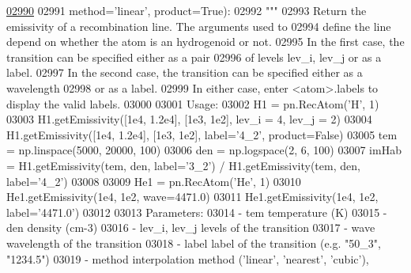 \begin{DoxyCode}
\hypertarget{classpyneb_1_1core_1_1pynebcore_1_1_rec_atom_l02990}{}\hyperlink{classpyneb_1_1core_1_1pynebcore_1_1_rec_atom_ac03957666aff1955387fcc03c6187ad3}{02990} 
02991                       method=\textcolor{stringliteral}{'linear'}, product=\textcolor{keyword}{True}):
02992         \textcolor{stringliteral}{"""}
02993 \textcolor{stringliteral}{        Return the emissivity of a recombination line. The arguments used to }
02994 \textcolor{stringliteral}{        define the line depend on whether the atom is an hydrogenoid or not. }
02995 \textcolor{stringliteral}{        In the first case, the transition can be specified either as a pair }
02996 \textcolor{stringliteral}{        of levels lev\_i, lev\_j or as a label. }
02997 \textcolor{stringliteral}{        In the second case, the transition can be specified either as a wavelength }
02998 \textcolor{stringliteral}{        or as a label.}
02999 \textcolor{stringliteral}{        In either case, enter <atom>.labels to display the valid labels.}
03000 \textcolor{stringliteral}{        }
03001 \textcolor{stringliteral}{        Usage:}
03002 \textcolor{stringliteral}{            H1 = pn.RecAtom('H', 1)}
03003 \textcolor{stringliteral}{            H1.getEmissivity([1e4, 1.2e4], [1e3, 1e2], lev\_i = 4, lev\_j = 2)}
03004 \textcolor{stringliteral}{            H1.getEmissivity([1e4, 1.2e4], [1e3, 1e2], label='4\_2', product=False)}
03005 \textcolor{stringliteral}{            tem = np.linspace(5000, 20000, 100)}
03006 \textcolor{stringliteral}{            den = np.logspace(2, 6, 100)}
03007 \textcolor{stringliteral}{            imHab = H1.getEmissivity(tem, den, label='3\_2') / H1.getEmissivity(tem, den, label='4\_2')}
03008 \textcolor{stringliteral}{}
03009 \textcolor{stringliteral}{            He1 = pn.RecAtom('He', 1)}
03010 \textcolor{stringliteral}{            He1.getEmissivity(1e4, 1e2, wave=4471.0)}
03011 \textcolor{stringliteral}{            He1.getEmissivity(1e4, 1e2, label='4471.0')}
03012 \textcolor{stringliteral}{            }
03013 \textcolor{stringliteral}{        Parameters:}
03014 \textcolor{stringliteral}{            - tem            temperature (K)}
03015 \textcolor{stringliteral}{            - den            density (cm-3)}
03016 \textcolor{stringliteral}{            - lev\_i, lev\_j   levels of the transition}
03017 \textcolor{stringliteral}{            - wave           wavelength of the transition}
03018 \textcolor{stringliteral}{            - label          label of the transition (e.g. "50\_3", "1234.5")}
03019 \textcolor{stringliteral}{            - method         interpolation method ('linear', 'nearest', 'cubic'), }

\end{DoxyCode}
